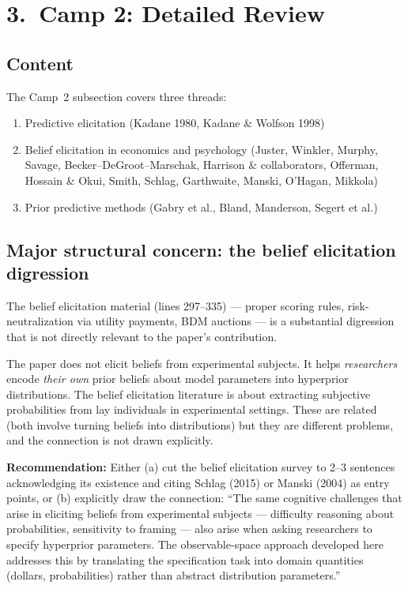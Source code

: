 \documentclass[12pt,a4paper]{article}
\begin{document}
\section{3.\ Camp 2: Detailed Review}

\subsection{Content}

The Camp~2 subsection covers three threads:
\begin{enumerate}[leftmargin=1.5em]
  \item Predictive elicitation (Kadane 1980, Kadane \& Wolfson 1998)
  \item Belief elicitation in economics and psychology (Juster, Winkler,
    Murphy, Savage, Becker--DeGroot--Marschak, Harrison \& collaborators,
    Offerman, Hossain \& Okui, Smith, Schlag, Garthwaite, Manski, O'Hagan,
    Mikkola)
  \item Prior predictive methods (Gabry et al., Bland, Manderson, Segert
    et al.)
\end{enumerate}

\subsection{Major structural concern: the belief elicitation digression}

The belief elicitation material (lines 297--335) --- proper scoring rules,
risk-neutralization via utility payments, BDM auctions --- is a substantial
digression that is not directly relevant to the paper's contribution.

The paper does not elicit beliefs from experimental subjects. It helps
\textit{researchers} encode \textit{their own} prior beliefs about model
parameters into hyperprior distributions. The belief elicitation literature is
about extracting subjective probabilities from lay individuals in
experimental settings. These are related (both involve turning beliefs into
distributions) but they are different problems, and the connection is not
drawn explicitly.

\textbf{Recommendation:} Either (a) cut the belief elicitation survey to 2--3
sentences acknowledging its existence and citing Schlag (2015) or Manski
(2004) as entry points, or (b) explicitly draw the connection: ``The same
cognitive challenges that arise in eliciting beliefs from experimental
subjects --- difficulty reasoning about probabilities, sensitivity to framing
--- also arise when asking researchers to specify hyperprior parameters.
The observable-space approach developed here addresses this by translating
the specification task into domain quantities (dollars, probabilities) rather
than abstract distribution parameters.''
\end{document}
